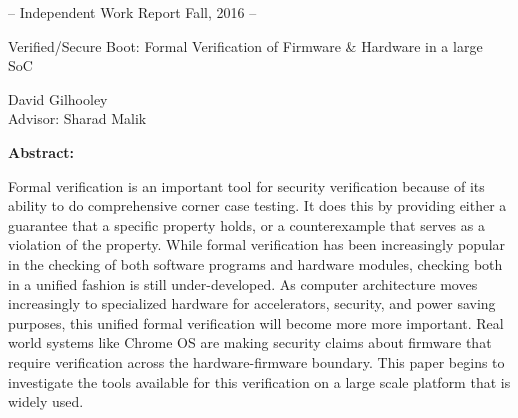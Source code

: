 \documentclass[../report.tex]{subfiles}
\begin{document}
\begin{center}
    \small{-- Independent Work Report Fall, 2016 --}
\end{center}

\vspace{1in}

\begin{center}
    \huge{Verified/Secure Boot: Formal Verification of Firmware \& Hardware in a large SoC} \\
\end{center}

\vspace{1in}

\begin{center}
    \Large{David Gilhooley} \\
    \vspace{0.1in}
    \large{Advisor: Sharad Malik} \\
\end{center}

\vspace{1in}

 \begin{center}
     \textbf{Abstract:}
 \end{center}

 \onehalfspacing
 Formal verification is an important tool for security verification because of its ability to do comprehensive corner case testing.
 It does this by providing either a guarantee that a specific property holds, or a counterexample that serves as a violation of the property.
 While formal verification has been increasingly popular in the checking of both software programs and hardware modules, checking both in a unified fashion is still under-developed.
 As computer architecture moves increasingly to specialized hardware for accelerators, security, and power saving purposes, this unified formal verification will become more more important.
 Real world systems like Chrome OS are making security claims about firmware that require verification across the hardware-firmware boundary. 
 This paper begins to investigate the tools available for this verification on a large scale platform that is widely used.



\thispagestyle{empty}

\newpage
\tableofcontents
\newpage
\end{document}
